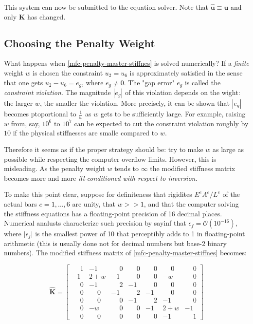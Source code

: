 \documentclass[10pt,b5paper,titlepage]{book}
\newcommand{\m}{\mathbf}
\begin{document}
This system can now be submitted to the equation solver. Note that
$ \m{\hat{u}} \equiv \m{u} $ and only $ \m{K} $ has changed.

\subsection{Choosing the Penalty Weight}

What happens when \eqref{mfc-penalty-master-stiffnes} is solved numerically?
If a \textit{finite} weight $ w $ is chosen the constraint $ u_2 = u_6 $ is
approximately satisfied in the sense that one gets $ u_2 - u_6 = e_g $, where
$ e_g \neq 0 $. The "gap error" $ e_g $ is called the \textit{constraint violation}.
The magnitude $ \left| e_g \right| $ of this violation depends on the wight:
the larger $ w $, the smaller the violation. More precisely, it can be shown
that $ | e_g | $ becomes ptoportional to $ \frac{1}{w} $ as $ w $ gets to be
sufficiently large. For example, raising $ w $ from, say, $ 10^6 $ to $ 10^7 $
can be expected to cut the constraint violation roughly by $ 10 $ if the physical
stiffnesses are smalle compared to $ w $.

Therefore it seems as if the proper strategy should be: try to make $ w $ as large
as possible while respecting the computer overflow limits. However, this is misleading.
As the penalty weight $ w $ tends to $ \infty $ the modified stiffness matrix becomes
more and more \textit{ill-conditioned with respect to inversion}.

To make this point clear, suppose for definiteness that rigidites
$ E^e A^e / L^e $ of the actual bars $ e = 1, \dots, 6 $ are unity, that
$ w >> 1 $, and that the computer solving the stiffness equations has a
floating-point precision of 16 decimal places. Numerical analusts characterize such
precision by sayinf that $ \epsilon_f = \mathcal{O}(10^{-16}) $, where
$ | \epsilon_f | $ is the smallest power of 10 that perceptibly adds to 1 in
floating-point arithmetic (this is usually done not for decimal numbers but
base-2 binary numbers). The modified stiffness matrix of \eqref{mfc-penalty-master-stiffnes}
becomes:

\begin{equation}
    \m{\hat{K}} =
    \begin{bmatrix}
        \phantom{-}1 & -1 & \phantom{-}0 & \phantom{-}0 & \phantom{-}0 & \phantom{-}0 & \phantom{-}0 \\
        -1 & 2+w & -1 & \phantom{-}0 & \phantom{-}0 & -w & \phantom{-}0 \\
        \phantom{-}0 & -1 & \phantom{-}2 & -1 & \phantom{-}0 & \phantom{-}0 & \phantom{-}0 \\
        \phantom{-}0 & \phantom{-}0 & -1 & \phantom{-}2 & -1 & \phantom{-}0 & \phantom{-}0 \\
        \phantom{-}0 & \phantom{-}0 & \phantom{-}0 & -1 & \phantom{-}2 & -1 & \phantom{-}0 \\
        \phantom{-}0 & -w & \phantom{-}0 & \phantom{-}0 & -1 & 2+w & -1 \\
        \phantom{-}0 & \phantom{-}0 & \phantom{-}0 & \phantom{-}0 & \phantom{-}0 & -1 & \phantom{-}1
    \end{bmatrix}
\end{equation}
\end{document}
